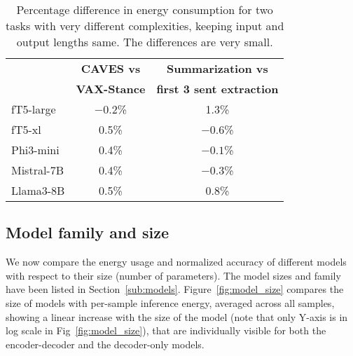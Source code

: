 

\begin{table}[t]
    \centering
    \footnotesize
    \begin{tabular}{|l|c|c|}
    \hline
               & \textbf{CAVES vs} & \textbf{Summarization vs} \\
               &              \textbf{VAX-Stance} & \textbf{first 3 sent extraction} \\
    \hline
    fT5-large  & $-0.2$\% &  1.3\% \\
    fT5-xl     &  0.5\% & $-0.6$\% \\
    Phi3-mini  &  0.4\% & $-0.1$\% \\
    Mistral-7B &  0.4\% & $-0.3$\% \\
    Llama3-8B  &  0.5\% &  0.8\% \\
    \hline
    \end{tabular}
    \caption{Percentage difference in energy consumption for two tasks with very different complexities, keeping input and output lengths same. The differences are very small.}
    \label{tab:task_complexity}
\end{table}






\subsection{Model family and size}
\label{sec:model-family}

We now compare the energy usage and normalized accuracy of different models with respect to their size (number of parameters). The model sizes and family have been listed in Section~\ref{sub:models}. 
%
Figure~\ref{fig:model_size} 
compares the size of models with per-sample inference energy, averaged across all samples, showing 
%
a linear increase with the size of the model 
(note that only Y-axis is in log scale in Fig~\ref{fig:model_size}), that are
individually visible for both the encoder-decoder and the decoder-only models.

